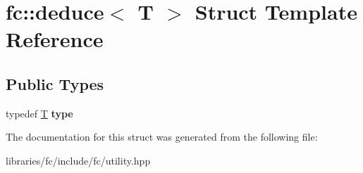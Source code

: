 \hypertarget{structfc_1_1deduce}{}\section{fc\+:\+:deduce$<$ T $>$ Struct Template Reference}
\label{structfc_1_1deduce}
\subsection*{Public Types}
\begin{DoxyCompactItemize}
\item 
\mbox{\label{structfc_1_1deduce_a3c66289241898d2f2de9eaedbae5667c}} 
typedef \mbox{\hyperlink{struct_t}{T}} {\bfseries type}
\end{DoxyCompactItemize}


The documentation for this struct was generated from the following file\+:\begin{DoxyCompactItemize}
\item 
libraries/fc/include/fc/utility.\+hpp\end{DoxyCompactItemize}
